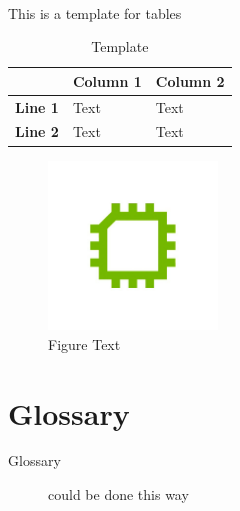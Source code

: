 \documentclass[openany]{scrreprt}
\begin{document}
\ \\

This is a template for tables
\begin{table}[!h]
\begin{tabular}{@{}cll@{}}
\toprule
\multicolumn{1}{l}{}                    & \multicolumn{1}{c}{\cellcolor[HTML]{AFAFAF}\textbf{Column 1}} & \multicolumn{1}{c}{\cellcolor[HTML]{AFAFAF}\textbf{Column 2}} \\ \midrule
\cellcolor[HTML]{AFAFAF}\textbf{Line 1} & Text                                                          & Text                                                          \\
\cellcolor[HTML]{AFAFAF}\textbf{Line 2} & Text                                                          & Text                                                          \\ \bottomrule
\end{tabular}
\caption{Template}
\label{tbl:example-table}
\end{table}

\newpage
\begin{figure}[!h]
\centering
\includegraphics[width=0.4\textwidth]{./data/CE_Logo.png}
\caption{Figure Text}
\label{img:example-figure}
\end{figure}

\newpage

\chapter{Glossary}
\begin{description}
\item[Glossary] 
could be done this way
\end{description}
\end{document}

